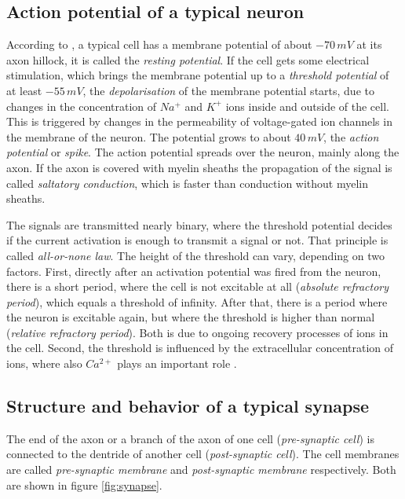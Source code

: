 \subsection{Action potential of a typical neuron}
\label{sec:act-pot}

According to \textcite{deetjen2005repetitorium}, a typical cell has a membrane potential of about $-70\,mV$ at its axon hillock, it is called the \emph{resting potential}. If the cell gets some electrical stimulation, which brings the membrane potential up to a \emph{threshold potential} of at least $-55\,mV$, the \emph{depolarisation} of the membrane potential starts, due to changes in the concentration of $Na^+$ and $K^+$ ions inside and outside of the cell. This is triggered by changes in the permeability of voltage-gated ion channels in the membrane of the neuron. The potential grows to about $40\,mV$, the \emph{action potential} or \emph{spike}. The action potential spreads over the neuron, mainly along the axon. If the axon is covered with myelin sheaths the propagation of the signal is called \emph{saltatory conduction}, which is faster than conduction without myelin sheaths.

The signals are transmitted nearly binary, where the threshold potential decides if the current activation is enough to transmit a signal or not. That principle is called \emph{all-or-none law}. The height of the threshold can vary, depending on two factors. First, directly after an activation potential was fired from the neuron, there is a short period, where the cell is not excitable at all (\emph{absolute refractory period}), which equals a threshold of infinity. After that, there is a period where the neuron is excitable again, but where the threshold is higher than normal (\emph{relative refractory period}). Both is due to ongoing recovery processes of ions in the cell. Second, the threshold is influenced by the extracellular concentration of ions, where also $Ca^{2+}$ plays an important role \parencite{deetjen2005repetitorium}.

\subsection{Structure and behavior of a typical synapse}
\label{sec:synapse}

The end of the axon or a branch of the axon of one cell (\emph{pre-synaptic cell}) is connected to the dentride of another cell (\emph{post-synaptic cell}). The cell membranes are called \emph{pre-synaptic membrane} and \emph{post-synaptic membrane} respectively. Both are shown in figure \ref{fig:synapse}.

